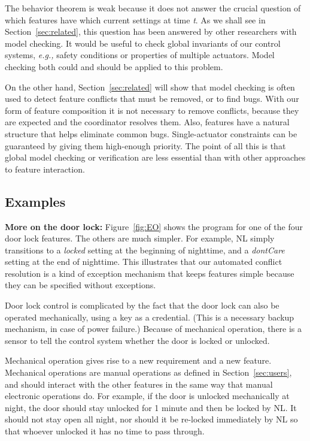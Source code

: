 \documentclass[conference]{IEEEtran}
\begin{document}
The behavior theorem is weak because it does not answer the crucial
question of which features have which current settings at time {\it t}.
As we shall see in Section~\ref{sec:related}, this question has been
answered by other researchers with model checking.
It would be useful to check global invariants of our control
systems, {\it e.g.,} safety conditions or
properties of multiple actuators.
Model checking both could and should be applied to this problem.

On the other hand, Section~\ref{sec:related} will show that model
checking is often used to detect feature conflicts that must be removed,
or to find bugs.
With our form of feature composition it is not necessary to remove
conflicts, because they are expected and the coordinator resolves
them.
Also, features have a natural structure that helps eliminate common bugs.
Single-actuator constraints can be guaranteed by giving them 
high-enough priority.
The point of all this is that global model checking or verification
are less essential than with other approaches to feature interaction.

\subsection{Examples}
\label{sec:examples}

{\bf More on the door lock:}
Figure~\ref{fig:EO} shows the program for one of the four door lock
features.
The others are much simpler.  
For example, NL simply transitions
to a {\it locked} setting at the beginning of
nighttime, and a {\it dontCare} setting at the end of nighttime.
This illustrates that our 
automated conflict resolution is a kind of exception
mechanism that keeps features simple because they can be specified
without exceptions.

Door lock control is complicated by the fact that the
door lock can also be operated mechanically, using a key as a credential.
(This is a necessary backup mechanism, in case of power failure.)
Because of mechanical operation, there is
a sensor to tell the control system
whether the door is locked or unlocked.

Mechanical operation gives rise to a new requirement and a new feature.
Mechanical operations are manual operations as defined 
in Section~\ref{sec:users}, and
should interact with the other features in the
same way that manual electronic operations do.
For example, if the door is unlocked mechanically at night, the
door should stay unlocked for 1 minute and then be locked by NL.
It should not stay open all night, nor should it be re-locked immediately
by NL so that whoever unlocked it has no time to pass through.
\end{document}
